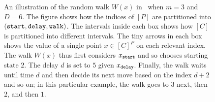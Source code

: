 \begin{figure}[t!]

\caption{An illustration of the random walk $W(x)$ in~ when $m=3$ and $D=6$. The figure shows how the indices of $[P]$ are partitioned into $(\textnormal{\texttt{start}},\textnormal{\texttt{delay}},\textnormal{\texttt{walk}})$. The intervals inside each box shows how $[C]$ is partitioned into different intervals. The tiny arrows in each box shows the value of a single point $x \in [C]^P$ on each relevant index. The walk $W(x)$ thus first considers $x_{\textnormal{\texttt{start}}}$ and so chooses starting state $2$. The delay $d$ is set to $5$ given $x_{\textnormal{\texttt{delay}}}$. Finally, the walk waits until time $d$ and then decide its next move based on the index $d+2$ and so on; in this particular example, the walk goes to $3$ next, then $2$, and then $1$. }
\label{fig:W(x)}
\end{figure}